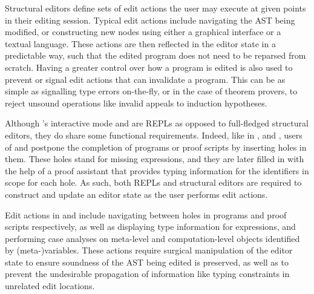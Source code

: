 
Structural editors define sets of edit actions the user may execute at given points in their editing session.
Typical edit actions include navigating the \ac{AST} being modified, or constructing new nodes using either a graphical interface or a textual language.
These actions are then reflected in the editor state in a predictable way, such that the edited program does not need to be reparsed from scratch.
Having a greater control over how a program is edited is also used to prevent or signal edit actions that can invalidate a program.
This can be as simple as signalling type errors on-the-fly, or in the case of theorem provers, to reject unsound operations like invalid appeals to induction hypotheses.


Although \Beluga's interactive mode and \Harpoon are \acp{REPL} as opposed to full-fledged structural editors, they do share some functional requirements.
Indeed, like in \Isabelle, \Hazel and \Coq, users of \Beluga and \Harpoon postpone the completion of programs or proof scripts by inserting holes in them.
These holes stand for missing expressions, and they are later filled in with the help of a proof assistant that provides typing information for the identifiers in scope for each hole.
As such, both \acp{REPL} and structural editors are required to construct and update an editor state as the user performs edit actions.


Edit actions in \Beluga and \Harpoon include navigating between holes in programs and proof scripts respectively, as well as displaying type information for expressions, and performing case analyses on meta-level and computation-level objects identified by \mbox{(meta-)variables}.
These actions require surgical manipulation of the editor state to ensure soundness of the \ac{AST} being edited is preserved, as well as to prevent the undesirable propagation of information like typing constraints in unrelated edit locations.


